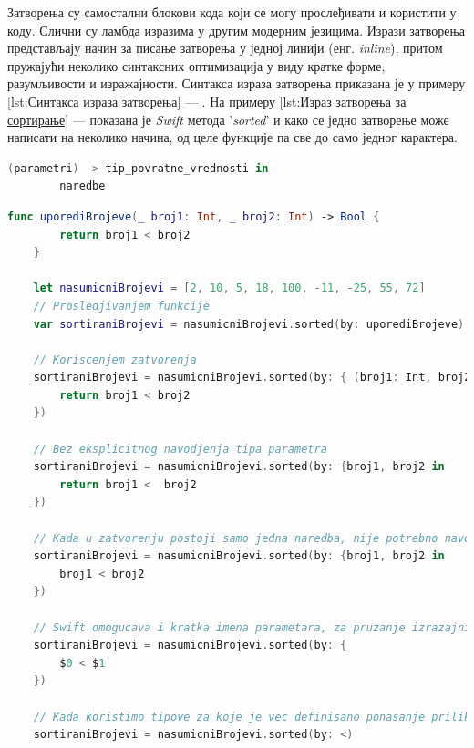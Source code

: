 \documentclass[12pt,oneside]{memoir}
\begin{document}
\indent Затворења су самостални блокови кода који се могу прослеђивати и користити у коду. Слични су ламбда изразима у другим модерним језицима. Изрази затворења представљају начин за писање затворења у једној линији (енг. \textit{inline}), притом пружајући неколико синтаксних оптимизација у виду кратке форме, разумљивости и изражајности. Синтакса израза затворења приказана је у примеру \ref{lst:Синтакса израза затворења} --- . На примеру \ref{lst:Израз затворења за сортирање} ---  показана је \textit{Swift} метода '\textit{sorted}' и како се једно затворење може написати на неколико начина, од целе функције па све до само једног карактера.

\begin{lstlisting}[caption=\textit{{Синтакса израза затворења}}, label={lst:Синтакса израза затворења}, language=Swift, frame=single]
    (parametri) -> tip_povratne_vrednosti in
        naredbe
\end{lstlisting}

\begin{lstlisting}[caption=\textit{{Израз затворења за сортирање}}, label={lst:Израз затворења за сортирање}, language=Swift, frame=single]
    func uporediBrojeve(_ broj1: Int, _ broj2: Int) -> Bool {
        return broj1 < broj2
    }
    
    let nasumicniBrojevi = [2, 10, 5, 18, 100, -11, -25, 55, 72]
    // Prosledjivanjem funkcije
    var sortiraniBrojevi = nasumicniBrojevi.sorted(by: uporediBrojeve)
    
    // Koriscenjem zatvorenja
    sortiraniBrojevi = nasumicniBrojevi.sorted(by: { (broj1: Int, broj2: Int) -> Bool in
        return broj1 < broj2
    })
    
    // Bez eksplicitnog navodjenja tipa parametra
    sortiraniBrojevi = nasumicniBrojevi.sorted(by: {broj1, broj2 in 
        return broj1 <  broj2
    })
    
    // Kada u zatvorenju postoji samo jedna naredba, nije potrebno navodjenje kljucne reci 'return', povratna vrednost bice vrednost izvrsenja te naredbe
    sortiraniBrojevi = nasumicniBrojevi.sorted(by: {broj1, broj2 in 
        broj1 < broj2
    })
    
    // Swift omogucava i kratka imena parametara, za pruzanje izrazajnije sintakse
    sortiraniBrojevi = nasumicniBrojevi.sorted(by: { 
        $0 < $1
    })
    
    // Kada koristimo tipove za koje je vec definisano ponasanje prilikom poredjenja, mozemo proslediti samo kako zelimo da sortiramo clanove niza
    sortiraniBrojevi = nasumicniBrojevi.sorted(by: <)
\end{lstlisting}
\end{document}
